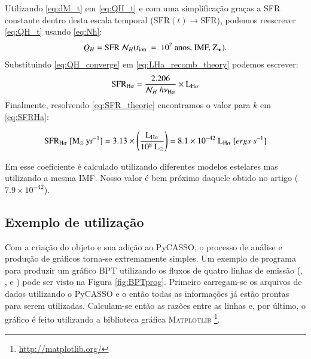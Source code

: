 Utilizando \eqref{eq:dM_t} em \eqref{eq:QH_t} e com uma simplificação graças a SFR constante dentro desta escala temporal ($\mathrm{SFR}(t)\rightarrow \mathrm{SFR}$), podemos reescrever \eqref{eq:QH_t} usando \eqref{eq:Nh}:
\begin{equation}
	Q_H = \mathrm{SFR}\ \mathcal{N}_H(t_{\rm ion}\ =\ 10^7\ \textrm{anos, IMF, Z}{}_\star).
	\label{eq:QH_converge}
\end{equation}
\noindent Substituindo \eqref{eq:QH_converge} em \eqref{eq:LHa_recomb_theory} podemos escrever:
\begin{equation}
	\mathrm{SFR}_{\Ha} = \frac{2.206}{\mathcal{N}_H\ h \nu_{\Ha}} \times \LHalpha
	\label{eq:SFR_theoric}
\end{equation}
\noindent
 Finalmente, resolvendo \eqref{eq:SFR_theoric} encontramos o valor para $k$ em \eqref{eq:SFRHa}:

\begin{equation}
	\mathrm{SFR}_{\Ha}\ [\mathrm{M}_\odot\ \mathrm{yr}^{-1}] = 3.13 \times
	\left(\frac{\LHalpha}{10^8\ \mathrm{L}_\odot}\right) = 8.1 \times 10^{-42}\ \LHalpha\ [ergs\ s^{-1}]
	\label{eq:SFRNeb}
\end{equation}

Em \citet{Kennicutt.1998a} esse coeficiente é calculado utilizando diferentes modelos estelares mas utilizando a mesma IMF. Nosso valor é bem próximo daquele obtido no artigo ($7.9 \times 10^{-42}$).

\subsection{Exemplo de utilização}
\label{apendice:EmLinesDataCube:props:example}
Com a criação do objeto \emldc e sua adição ao PyCASSO, o processo de análise e produção de gráficos torna-se extremamente simples. Um exemplo de programa para produzir um gráfico BPT \citep{Baldwin.Phillips.Terlevich.1981a} utilizando os fluxos de quatro linhas de emissão (\Ha, \Hb, \oiii e \nii) pode ser visto na Figura \ref{fig:BPTprog}. Primeiro carregam-se os arquivos de dados utilizando o PyCASSO e o \emldc então todas as informações já estão prontas para serem utilizadas. Calculam-se então as razões entre as linhas e, por último, o gráfico é feito utilizando a biblioteca gráfica M\textsc{atplotlib} \footnote{\href{http://matplotlib.org/}{http://matplotlib.org/}}.

